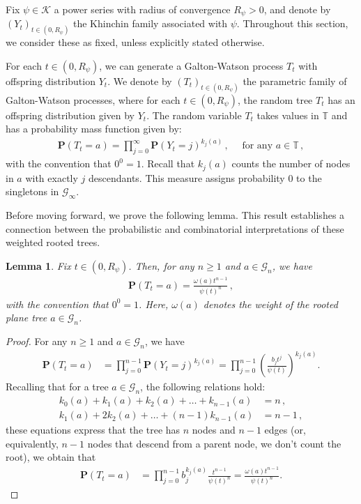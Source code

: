 \documentclass[11pt,a4paper,leqno]{amsart}
\theoremstyle{plain}
\newtheorem{lem}[theo]{Lemma}
\theoremstyle{definition}
\numberwithin{equation}{section}
\def\P{\mathbf{P}}
\begin{document}
	Fix \( \psi \in \mathcal{K} \) a power series with radius of convergence \( R_{\psi} > 0 \), and denote by \( (Y_t)_{t \in (0,R_{\psi})} \) the Khinchin family associated with \( \psi \). Throughout this section, we consider these as fixed, unless explicitly stated otherwise.
	\smallskip
	
	For each \( t \in (0,R_{\psi})\), we can generate a Galton-Watson process \( T_t \) with offspring distribution \( Y_t \). 
	We denote by \( (T_t)_{t \in (0,R_{\psi})} \) the parametric family of Galton-Watson processes, where for each \( t \in (0,R_{\psi}) \), 
	the random tree \( T_t \) has an offspring distribution given by \( Y_t \). The random variable \( T_t \) takes values in \( \mathbb{T} \) and has a probability mass function given by:
	\begin{align}\label{eq: measure}
		\P(T_t = a) = \prod_{j = 0}^{\infty}\P(Y_t = j)^{k_j(a)}\,, \quad \text{ for any } a \in \mathbb{T}\,,
	\end{align}
	with the convention that $0^0 = 1$. Recall that $k_j(a)$ counts the number of nodes in $a$ with exactly $j$ descendants. This measure assigns probability $0$ to the singletons in $\mathcal{G}_{\infty}$. 
	\smallskip
	
	Before moving forward, we prove the following lemma. This result establishes a connection between the probabilistic and combinatorial interpretations of these weighted rooted trees.
	\begin{lem} \label{lemma: weight_prob}
		Fix \( t \in (0,R_{\psi}) \). Then, for any \( n \geq 1 \) and \( a \in \mathcal{G}_n \), we have
		\begin{align*}
			\P(T_t = a) = \frac{\omega(a)t^{n-1}}{\psi(t)^n}\,,  
		\end{align*}
		with the convention that $0^0 = 1$. Here, \( \omega(a) \) denotes the weight of the rooted plane tree \( a \in \mathcal{G}_n \).
	\end{lem}
	
	\begin{proof} 
		For any \( n \geq 1 \) and \( a \in \mathcal{G}_n \), we have
		\begin{align*}
			\P(T_t = a) &= \prod_{j = 0}^{n-1} \P(Y_t = j)^{k_j(a)} 
			= \prod_{j = 0}^{n-1} \left( \frac{b_j t^j}{\psi(t)} \right)^{k_j(a)}.
		\end{align*}
		Recalling that for a tree \( a \in \mathcal{G}_n \), the following relations hold:
		\begin{align*}
			k_0(a) + k_1(a) + k_2(a) + \dots + k_{n-1}(a) &= n\,, \\
			k_1(a) + 2k_2(a) + \dots + (n-1)k_{n-1}(a) &= n-1\,,
		\end{align*}
		these equations express that the tree has \( n \) nodes and \( n-1 \) edges (or, equivalently, $n-1$ nodes that descend from a parent node, we don't count the root), we obtain that
		\begin{align*}
			\P(T_t = a) &= \prod_{j = 0}^{n-1} b_j^{k_j(a)} \frac{t^{n-1}}{\psi(t)^n} 
			= \frac{\omega(a)t^{n-1}}{\psi(t)^n}.
		\end{align*}
	\end{proof}
	
\end{document}
